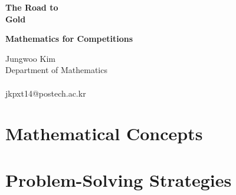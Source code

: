 \documentclass[11pt,oneside]{book}
\begin{document}

    \begin{titlepage}
        \centering
        \vspace*{3.2cm}

        {\Huge\bfseries
            The Road to\\[0.35em]
            \textcolor{GoldTitle}{Gold}\par}

        \vspace{0.7cm}
        {\LARGE\bfseries Mathematics for Competitions\par}

        \vspace{1.75cm}
        {\large
            Jungwoo Kim\\
            Department of Mathematics\\
            \PohangUniversityOfScienceAndTechnology\\[0.5em]
            jkpxt14@postech.ac.kr\par}

        \vfill
    \end{titlepage}

    
    
    \tableofcontents

    \part{Mathematical Concepts}
    

    \part{Problem-Solving Strategies}
    
\end{document}
